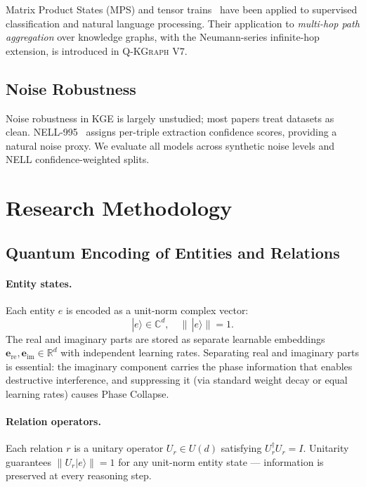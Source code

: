 \documentclass[runningheads]{llncs}
\newcommand{\QR}{\textsc{Q-KGraph}}
\newcommand{\CC}{\mathbb{C}}
\newcommand{\RR}{\mathbb{R}}
\newcommand{\Ud}{U(d)}
\newcommand{\dagop}{^\dagger}
\newcommand{\ket}[1]{|#1\rangle}
\begin{document}
Matrix Product States (MPS) and tensor trains~\cite{ref_mps} have been
applied to supervised classification and natural language processing.  Their
application to \emph{multi-hop path aggregation} over knowledge graphs, with
the Neumann-series infinite-hop extension, is introduced in \QR{} V7.

\subsection{Noise Robustness}

Noise robustness in KGE is largely unstudied; most papers treat datasets as
clean.  NELL-995~\cite{ref_nell} assigns per-triple extraction confidence
scores, providing a natural noise proxy.  We evaluate all models across
synthetic noise levels and NELL confidence-weighted splits.

\section{Research Methodology}
\label{sec:method}

\subsection{Quantum Encoding of Entities and Relations}
\label{sec:encoding}

\paragraph{Entity states.}
Each entity $e$ is encoded as a unit-norm complex vector:
\[
  \ket{e}\in\CC^d,\quad\|\,\ket{e}\|=1.
\]
The real and imaginary parts are stored as separate learnable embeddings
$\mathbf{e}_\text{re},\mathbf{e}_\text{im}\in\RR^d$ with independent
learning rates.  Separating real and imaginary parts is essential: the
imaginary component carries the phase information that enables destructive
interference, and suppressing it (via standard weight decay or equal learning
rates) causes Phase Collapse.

\paragraph{Relation operators.}
Each relation $r$ is a unitary operator $U_r\in\Ud$ satisfying
$U_r\dagop U_r=I$.  Unitarity guarantees $\|U_r\ket{e}\|=1$ for any
unit-norm entity state --- information is preserved at every reasoning step.
\end{document}
